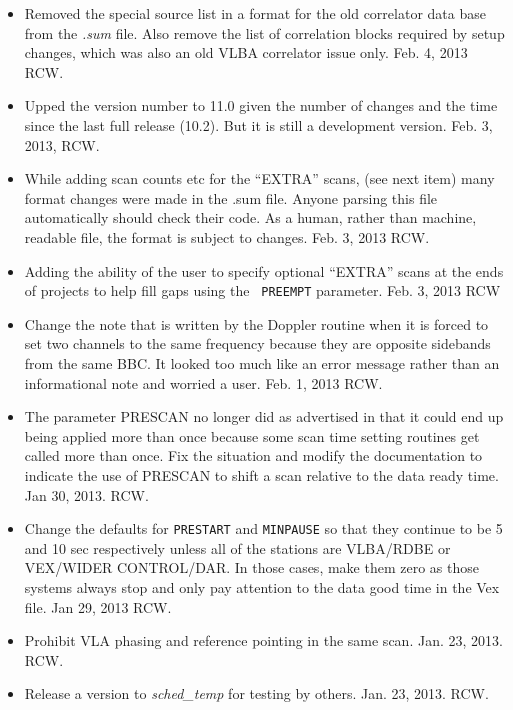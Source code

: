 \documentclass{report}
\begin{document}
\begin{itemize}
\item Removed the special source list in a format for the old correlator
data base from the {\sl .sum} file.  Also remove the list of 
correlation blocks required by setup changes, which was also an
old VLBA correlator issue only.  Feb. 4, 2013  RCW.

\item Upped the version number to 11.0 given the number of changes
and the time since the last full release (10.2).  But it is still
a development version.  Feb. 3, 2013,  RCW.

\item While adding scan counts etc for the ``EXTRA'' scans, (see next
item) many format changes were made in the .sum file.  Anyone parsing
this file automatically should check their code.  As a human, rather
than machine, readable file, the format is subject to changes.
Feb. 3, 2013 RCW.

\item Adding the ability of the user to specify optional ``EXTRA''
scans at the ends of projects to help fill gaps using the {\tt
PREEMPT} parameter.  Feb. 3, 2013 RCW

\item Change the note that is written by the Doppler routine when
it is forced to set two channels to the same frequency because they
are opposite sidebands from the same BBC.  It looked too much like an 
error message rather than an informational note and worried a user.
Feb. 1, 2013  RCW.

\item The parameter PRESCAN no longer did as advertised in that it
could end up being applied more than once because some scan time
setting routines get called more than once.  Fix the situation and
modify the documentation to indicate the use of PRESCAN to shift
a scan relative to the data ready time.  Jan 30, 2013.  RCW.

\item Change the defaults for {\tt PRESTART} and {\tt MINPAUSE} so
that they continue to be 5 and 10 sec respectively unless all of
the stations are VLBA/RDBE or VEX/WIDER CONTROL/DAR.  In those
cases, make them zero as those systems always stop and only pay
attention to the data good time in the Vex file.  Jan 29, 2013  RCW.

\item Prohibit VLA phasing and reference pointing in the same scan.
Jan. 23, 2013. RCW.

\item Release a version to {\sl sched\_temp} for testing by others.  
Jan. 23, 2013. RCW.


\end{itemize}
\end{document}
